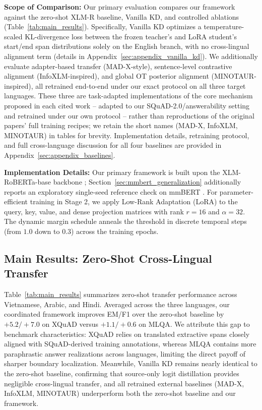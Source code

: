 \documentclass[11pt]{article}
\begin{document}
\textbf{Scope of Comparison:} Our primary evaluation compares our framework against the zero-shot XLM-R baseline, Vanilla KD, and controlled ablations (Table~\ref{tab:main_results}). Specifically, Vanilla KD optimizes a temperature-scaled KL-divergence loss between the frozen teacher's and LoRA student's start/end span distributions solely on the English branch, with no cross-lingual alignment term (details in Appendix~\ref{sec:appendix_vanilla_kd}). We additionally evaluate adapter-based transfer (MAD-X-style), sentence-level contrastive alignment (InfoXLM-inspired), and global OT posterior alignment (MINOTAUR-inspired), all retrained end-to-end under our exact protocol on all three target languages. These three are task-adapted implementations of the core mechanism proposed in each cited work -- adapted to our SQuAD-2.0/answerability setting and retrained under our own protocol -- rather than reproductions of the original papers' full training recipes; we retain the short names (MAD-X, InfoXLM, MINOTAUR) in tables for brevity. Implementation details, retraining protocol, and full cross-language discussion for all four baselines are provided in Appendix~\ref{sec:appendix_baselines}.

\textbf{Implementation Details:} Our primary framework is built upon the XLM-RoBERTa-base backbone \citep{conneau-etal-2020-unsupervised}; Section~\ref{sec:mmbert_generalization} additionally reports an exploratory single-seed reference check on mmBERT \citep{marone2026mmbert}. For parameter-efficient training in Stage 2, we apply Low-Rank Adaptation (LoRA) \citep{hu2022lora} to the query, key, value, and dense projection matrices with rank $r=16$ and $\alpha=32$. The dynamic margin schedule anneals the threshold in discrete temporal steps (from $1.0$ down to $0.3$) across the training epochs. 

\subsection{Main Results: Zero-Shot Cross-Lingual Transfer}

Table~\ref{tab:main_results} summarizes zero-shot transfer performance across Vietnamese, Arabic, and Hindi. Averaged across the three languages, our coordinated framework improves EM/F1 over the zero-shot baseline by $+5.2/+7.0$ on XQuAD versus $+1.1/+0.6$ on MLQA. We attribute this gap to benchmark characteristics: XQuAD relies on translated extractive spans closely aligned with SQuAD-derived training annotations, whereas MLQA contains more paraphrastic answer realizations across languages, limiting the direct payoff of sharper boundary localization. Meanwhile, Vanilla KD remains nearly identical to the zero-shot baseline, confirming that source-only logit distillation provides negligible cross-lingual transfer, and all retrained external baselines (MAD-X, InfoXLM, MINOTAUR) underperform both the zero-shot baseline and our framework.
\end{document}
